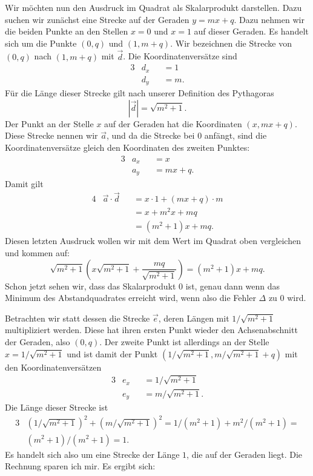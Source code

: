\documentclass[a4paper]{amsart}
\theoremstyle{definition}
\begin{document}
Wir möchten nun den Ausdruck im Quadrat als Skalarprodukt darstellen. Dazu suchen wir zunächst eine Strecke auf der Geraden $y = mx+q$. Dazu nehmen wir die beiden Punkte an den Stellen $x=0$ und $x=1$ auf dieser Geraden. Es handelt sich um die Punkte $(0,q)$ und $(1,m+q)$. Wir bezeichnen die Strecke von
$(0,q)$ nach $(1,m+q)$ mit $\vec d$. Die Koordinatenversätze sind
\begin{alignat}{3}
   &d_x &&= 1\\
   &d_y &&= m.
\end{alignat}
Für die Länge dieser Strecke gilt nach unserer Definition des Pythagoras
\begin{equation}
   \boxed{|\vec d| = \sqrt{m^2+1}}.
\end{equation}
Der Punkt an der Stelle $x$ auf der Geraden hat die Koordinaten $(x, mx+q)$. Diese Strecke nennen wir $\vec a$, und da die Strecke bei $0$ anfängt, sind die Koordinatenversätze gleich den Koordinaten des zweiten Punktes:
\begin{alignat}{3}
   &a_x &&= x\\
   &a_y &&= mx+q.
\end{alignat}
Damit gilt
\begin{alignat}{4}
   &\vec a \cdot \vec d &&= x \cdot 1 + (mx+q) \cdot m\\
   &                    &&= x + m^2x+mq\\
   &                    &&= (m^2+1)x +mq.
\end{alignat}
Diesen letzten Ausdruck wollen wir mit dem Wert im Quadrat oben vergleichen und kommen auf:
\begin{equation}
   \sqrt{m^2+1} \left(x \sqrt{m^2+1} + \frac{mq}{\sqrt{m^2+1}} \right) = (m^2+1)x +mq.
\end{equation}
Schon jetzt sehen wir, dass das Skalarprodukt $0$ ist, genau dann wenn das Minimum des Abstandquadrates erreicht wird, wenn also die Fehler $\Delta$ zu $0$ wird.

Betrachten wir statt dessen die Strecke $\vec e$, deren Längen mit $1/\sqrt{m^2+1}$ multipliziert werden. Diese hat ihren ersten Punkt wieder den Achsenabschnitt der Geraden, also $(0,q)$. Der zweite Punkt ist allerdings an der Stelle $x=1/\sqrt{m^2+1}$ und ist damit der Punkt $(1/\sqrt{m^2+1}, m/\sqrt{m^2+1} + q)$ mit den Koordinatenversätzen
\begin{alignat}{3}
   &e_x &&= 1/\sqrt{m^2+1}\\
   &e_y &&= m/\sqrt{m^2+1}.
\end{alignat}
Die Länge dieser Strecke ist
\begin{alignat}{3}
   &(1/\sqrt{m^2+1})^2 + (m/\sqrt{m^2+1})^2 = 1/(m^2+1) + m^2/(m^2+1) = \\
   &(m^2 +1)/(m^2 +1) = 1.
\end{alignat}
Es handelt sich also um eine Strecke der Länge $1$, die auf der Geraden liegt.
Die Rechnung sparen ich mir. Es ergibt sich:
\end{document}
